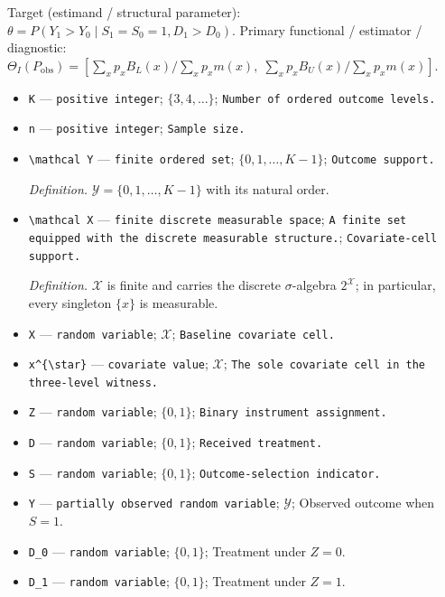 \documentclass{article}
\begin{document}
Target (estimand / structural parameter): \(\theta=P(Y_1>Y_0\mid S_1=S_0=1,D_1>D_0)\).
Primary functional / estimator / diagnostic: \(\Theta_I(P_{\mathrm{obs}})=\left[\sum_xp_xB_L(x)/\sum_xp_xm(x),\;\sum_xp_xB_U(x)/\sum_xp_xm(x)\right]\).
\begin{itemize}
  \item \texttt{K} --- \texttt{positive integer}; \(\{3,4,\ldots\}\); \texttt{Number of ordered outcome levels.}
  \item \texttt{n} --- \texttt{positive integer}; \texttt{Sample size.}
  \item \texttt{\textbackslash{}\allowbreak{}mathcal Y} --- \texttt{finite ordered set}; \(\{0,1,\ldots,K-1\}\); \texttt{Outcome support.}
  \par\smallskip\noindent\emph{Definition.} \(\mathcal Y=\{0,1,\ldots,K-1\}\) with its natural order.
  \item \texttt{\textbackslash{}\allowbreak{}mathcal X} --- \texttt{finite discrete measurable space}; \texttt{A finite set equipped with the discrete measurable structure.}; \texttt{Covariate-\allowbreak{}cell support.}
  \par\smallskip\noindent\emph{Definition.} \(\mathcal X\) is finite and carries the discrete \(\sigma\)-algebra \(2^{\mathcal X}\); in particular, every singleton \(\{x\}\) is measurable.
  \item \texttt{X} --- \texttt{random variable}; \(\mathcal X\); \texttt{Baseline covariate cell.}
  \item \texttt{x\textasciicircum{}\{\textbackslash{}\allowbreak{}star\}\allowbreak{}} --- \texttt{covariate value}; \(\mathcal X\); \texttt{The sole covariate cell in the three-\allowbreak{}level witness.}
  \item \texttt{Z} --- \texttt{random variable}; \(\{0,1\}\); \texttt{Binary instrument assignment.}
  \item \texttt{D} --- \texttt{random variable}; \(\{0,1\}\); \texttt{Received treatment.}
  \item \texttt{S} --- \texttt{random variable}; \(\{0,1\}\); \texttt{Outcome-\allowbreak{}selection indicator.}
  \item \texttt{Y} --- \texttt{partially observed random variable}; \(\mathcal Y\); Observed outcome when \(S=1\).
  \item \texttt{D\_\allowbreak{}0} --- \texttt{random variable}; \(\{0,1\}\); Treatment under \(Z=0\).
  \item \texttt{D\_\allowbreak{}1} --- \texttt{random variable}; \(\{0,1\}\); Treatment under \(Z=1\).

\end{itemize}
\end{document}
